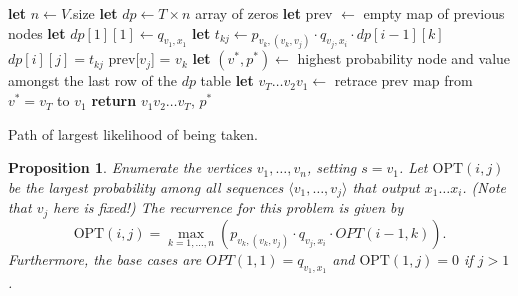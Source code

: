 \documentclass[10pt]{article}
\newtheorem{proposition}[lemma]{Proposition}
\newcommand{\OPT}{\text{OPT}}
\begin{document}
\begin{algorithm}[htb]
  \begin{algorithmic}
    \STATE \textbf{let} \(n \gets V\).size
    \STATE \textbf{let} \(dp \gets T \times n\) array of zeros
    \STATE \textbf{let} prev \(\gets\) empty map of previous nodes
    \STATE \textbf{let} \(dp[1][1] \gets q_{v_1, x_1}\)
          \STATE \textbf{let} \(t_{kj} \gets p_{v_k, (v_k, v_j)} \cdot q_{v_j, x_i} \cdot dp[i - 1][k]\)
            \STATE \(dp[i][j] = t_{kj}\)
            \STATE prev[\(v_j\)] = \(v_k\)
          \ENDIF
        \ENDFOR
      \ENDFOR
    \ENDFOR
    \STATE \textbf{let} \((v^*, p^*) \gets\) highest probability node and value amongst the last row of the \(dp\) table
    \STATE \textbf{let} \(v_T \ldots v_2 v_1 \gets\) retrace prev map from \(v^* = v_T\) to \(v_1\)
    \STATE \textbf{return} \(v_1 v_2 \ldots v_T\), \(p^*\)
  \end{algorithmic}
\caption{Path of largest likelihood of being taken. \label{alg:most-probable-path}}
\end{algorithm}

\begin{proposition}
  Enumerate the vertices \(v_1, \ldots, v_n\), setting \(s = v_1\). Let \(\OPT(i, j)\) be the largest probability among all sequences \(\langle v_1, \ldots, v_j\rangle\) that output \(x_1 \ldots x_i\). (Note that \(v_j\) here is fixed!) The recurrence for this problem is given by 
  \[\OPT(i, j) = \max_{k = 1, \ldots, n}(p_{v_k, (v_k, v_j)} \cdot q_{v_j, x_i} \cdot OPT(i - 1, k)).\]
  Furthermore, the base cases are \(OPT(1, 1) = q_{v_1, x_1}\) and \(\OPT(1, j) = 0\) if \(j > 1\).
\end{proposition}
\end{document}
